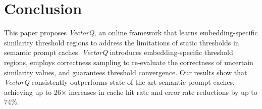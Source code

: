 \section{Conclusion}
\label{conclusion}
This paper proposes \textit{VectorQ}, an online framework that learns embedding-specific similarity threshold regions to address the limitations of static thresholds in semantic prompt caches. \textit{VectorQ} introduces embedding-specific threshold regions, employs correctness sampling to re-evaluate the correctness of uncertain similarity values, and guarantees threshold convergence. Our results show that \textit{VectorQ} consistently outperforms state-of-the-art semantic prompt caches, achieving up to 26× increases in cache hit rate and error rate reductions by up to 74\%.
